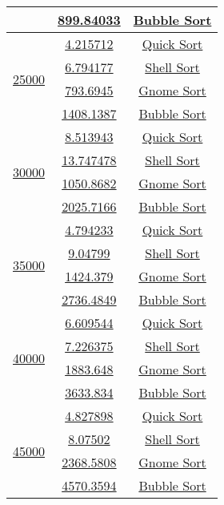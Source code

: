 \begin{lrbox}{\sorttime}
\begin{tabular}{|c|c|c|}
\cline{2-3}
 & {\href{T1.14.1}{899.84033}} & {\href{T1.14.2}{Bubble Sort}}\\
\hline
 \multirow{4}{*}{\href{T1.19.0}{25000}} & {\href{T1.16.1}{4.215712}} & {\href{T1.16.2}{Quick Sort}}\\
\cline{2-3}
 & {\href{T1.17.1}{6.794177}} & {\href{T1.17.2}{Shell Sort}}\\
\cline{2-3}
 & {\href{T1.19.1}{793.6945}} & {\href{T1.19.2}{Gnome Sort}}\\
\cline{2-3}
 & {\href{T1.18.1}{1408.1387}} & {\href{T1.18.2}{Bubble Sort}}\\
\hline
 \multirow{4}{*}{\href{T1.23.0}{30000}} & {\href{T1.20.1}{8.513943}} & {\href{T1.20.2}{Quick Sort}}\\
\cline{2-3}
 & {\href{T1.21.1}{13.747478}} & {\href{T1.21.2}{Shell Sort}}\\
\cline{2-3}
 & {\href{T1.23.1}{1050.8682}} & {\href{T1.23.2}{Gnome Sort}}\\
\cline{2-3}
 & {\href{T1.22.1}{2025.7166}} & {\href{T1.22.2}{Bubble Sort}}\\
\hline
 \multirow{4}{*}{\href{T1.26.0}{35000}} & {\href{T1.24.1}{4.794233}} & {\href{T1.24.2}{Quick Sort}}\\
\cline{2-3}
 & {\href{T1.25.1}{9.04799}} & {\href{T1.25.2}{Shell Sort}}\\
\cline{2-3}
 & {\href{T1.27.1}{1424.379}} & {\href{T1.27.2}{Gnome Sort}}\\
\cline{2-3}
 & {\href{T1.26.1}{2736.4849}} & {\href{T1.26.2}{Bubble Sort}}\\
\hline
 \multirow{4}{*}{\href{T1.31.0}{40000}} & {\href{T1.28.1}{6.609544}} & {\href{T1.28.2}{Quick Sort}}\\
\cline{2-3}
 & {\href{T1.29.1}{7.226375}} & {\href{T1.29.2}{Shell Sort}}\\
\cline{2-3}
 & {\href{T1.31.1}{1883.648}} & {\href{T1.31.2}{Gnome Sort}}\\
\cline{2-3}
 & {\href{T1.30.1}{3633.834}} & {\href{T1.30.2}{Bubble Sort}}\\
\hline
 \multirow{4}{*}{\href{T1.33.0}{45000}} & {\href{T1.32.1}{4.827898}} & {\href{T1.32.2}{Quick Sort}}\\
\cline{2-3}
 & {\href{T1.33.1}{8.07502}} & {\href{T1.33.2}{Shell Sort}}\\
\cline{2-3}
 & {\href{T1.35.1}{2368.5808}} & {\href{T1.35.2}{Gnome Sort}}\\
\cline{2-3}
 & {\href{T1.34.1}{4570.3594}} & {\href{T1.34.2}{Bubble Sort}}\\
\hline

\end{tabular}
\end{lrbox}

